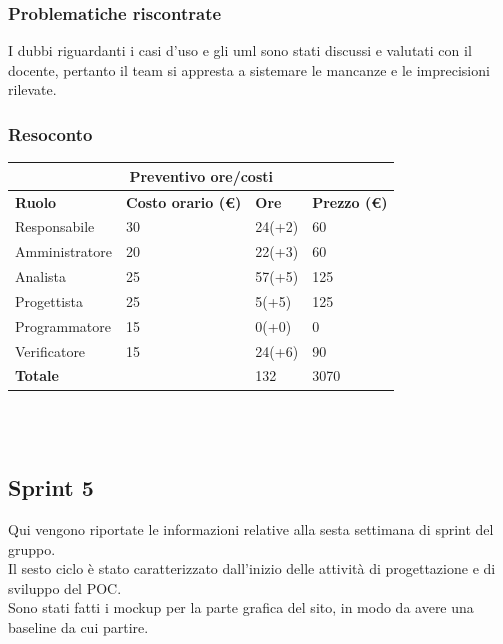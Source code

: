 \documentclass[12pt]{article}
\begin{document}
\subsubsection{Problematiche riscontrate}
I dubbi riguardanti i casi d'uso e gli uml sono stati discussi e valutati con il docente, pertanto il team si appresta a sistemare le mancanze e le imprecisioni rilevate.
\subsubsection{Resoconto}
\begin{center}
	\begin{tabularx}{\textwidth}{|X|X|X|X|}
		\hline
		\multicolumn{4}{|c|}{\textbf{Preventivo ore/costi}}                                      \\
		\hline
		\hline
		\textbf{Ruolo}  & \textbf{Costo orario (\euro)} & \textbf{Ore} & \textbf{Prezzo (\euro)} \\
		\hline
		Responsabile    & 30                            & 24(+2)       & 60                      \\
		\hline
		Amministratore  & 20                            & 22(+3)       & 60                      \\
		\hline
		Analista        & 25                            & 57(+5)       & 125                     \\
		\hline
		Progettista     & 25                            & 5(+5)        & 125                     \\
		\hline
		Programmatore   & 15                            & 0(+0)        & 0                       \\
		\hline
		Verificatore    & 15                            & 24(+6)       & 90                      \\
		\hline
		\hline
		\textbf{Totale} &                               & 132          & 3070                    \\
		\hline
	\end{tabularx}\\[8pt]
	\mbox{}\\
\end{center}

\subsection{Sprint 5}
Qui vengono riportate le informazioni relative alla sesta settimana di sprint del gruppo. \\
Il sesto ciclo è stato caratterizzato dall'inizio delle attività di progettazione e di sviluppo del POC. \\
Sono stati fatti i mockup per la parte grafica del sito, in modo da avere una baseline da cui partire.
\end{document}
